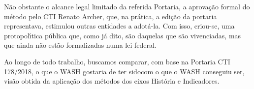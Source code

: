 \documentclass[
12pt,		%
openright,	%
twoside,  %
a4paper,			%
chapter=TITLE,		%
english,			%
french,				%
spanish,			%
brazil				%
]{USPSC-classe/USPSC}
\begin{document}
N\~ao obstante o alcance legal limitado da referida Portaria, a aprova\c{c}\~ao formal do m\'etodo pelo CTI Renato Archer, que, na pr\'atica, a edi\c{c}\~ao da portaria representava, estimulou outras entidades a adot\'a-la. Com isso, criou-se, uma protopol\'{\i}tica p\'ublica que, como j\'a dito, s\~ao \textquotedbl daquelas que s\~ao vivenciadas, mas que ainda n\~ao est\~ao formalizadas numa lei federal\textquotedbl .








Ao longo de todo trabalho, buscamos comparar, com base na Portaria CTI 178/2018, \textquotedbl o que o WASH gostaria de ter sido\textquotedbl  com \textquotedbl o que o WASH conseguiu ser\textquotedbl , vis\~ao obtida da aplica\c{c}\~ao dos m\'etodos dos eixos Hist\'oria e Indicadores.
\end{document}
